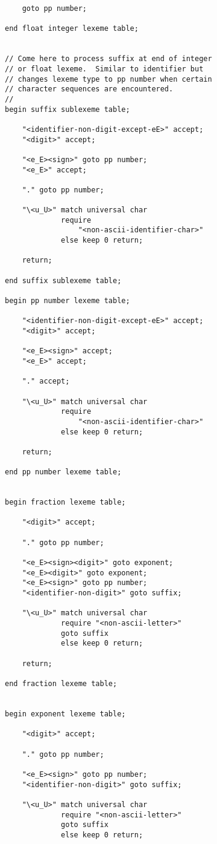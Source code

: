 \documentclass[12pt]{article}
\newenvironment{indpar}[1][0.3in]%
	{\begin{list}{}%
		     {\setlength{\itemsep}{0in}%
		      \setlength{\topsep}{0in}%
		      \setlength{\parsep}{1ex}%
		      \setlength{\labelwidth}{#1}%
		      \setlength{\leftmargin}{#1}%
		      \addtolength{\leftmargin}{\labelsep}}%
	 \item}%
	{\end{list}}
\begin{document}
\begin{indpar}
\begin{verbatim}
    goto pp number;

end float integer lexeme table;


// Come here to process suffix at end of integer
// or float lexeme.  Similar to identifier but
// changes lexeme type to pp number when certain
// character sequences are encountered.
//
begin suffix sublexeme table;

    "<identifier-non-digit-except-eE>" accept;
    "<digit>" accept;

    "<e_E><sign>" goto pp number;
    "<e_E>" accept;

    "." goto pp number;

    "\<u_U>" match universal char
             require
                 "<non-ascii-identifier-char>"
             else keep 0 return;

    return;

end suffix sublexeme table;

begin pp number lexeme table;

    "<identifier-non-digit-except-eE>" accept;
    "<digit>" accept;

    "<e_E><sign>" accept;
    "<e_E>" accept;

    "." accept;

    "\<u_U>" match universal char
             require
                 "<non-ascii-identifier-char>"
             else keep 0 return;

    return;

end pp number lexeme table;


begin fraction lexeme table;

    "<digit>" accept;

    "." goto pp number;

    "<e_E><sign><digit>" goto exponent;
    "<e_E><digit>" goto exponent;
    "<e_E><sign>" goto pp number;
    "<identifier-non-digit>" goto suffix;

    "\<u_U>" match universal char
             require "<non-ascii-letter>"
             goto suffix
             else keep 0 return;

    return;

end fraction lexeme table;


begin exponent lexeme table;

    "<digit>" accept;

    "." goto pp number;

    "<e_E><sign>" goto pp number;
    "<identifier-non-digit>" goto suffix;

    "\<u_U>" match universal char
             require "<non-ascii-letter>"
             goto suffix
             else keep 0 return;


\end{verbatim}
\end{indpar}
\end{document}
